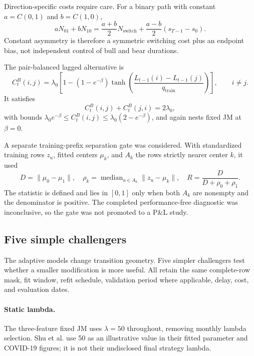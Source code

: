 \documentclass[11pt]{article}
\begin{document}
Direction-specific costs require care. For a binary path with constant
\(a=C(0,1)\) and \(b=C(1,0)\),
\begin{equation}
aN_{01}+bN_{10}
=\frac{a+b}{2}N_{\mathrm{switch}}
+\frac{a-b}{2}(s_{T-1}-s_0).
\label{eq:directed}
\end{equation}
Constant asymmetry is therefore a symmetric switching cost plus an endpoint
bias, not independent control of bull and bear durations.

The pair-balanced lagged alternative is
\begin{equation}
C^B_t(i,j)=\lambda_0\left[
1-(1-e^{-\beta})
\tanh\!\left(
\frac{L_{t-1}(i)-L_{t-1}(j)}{q_{\mathrm{train}}}
\right)\right],\qquad i\ne j.
\label{eq:balanced}
\end{equation}
It satisfies
\begin{equation}
C^B_t(i,j)+C^B_t(j,i)=2\lambda_0,
\label{eq:pairsum}
\end{equation}
with bounds
\(\lambda_0e^{-\beta}\le C^B_t(i,j)\le
\lambda_0(2-e^{-\beta})\), and again nests fixed JM at \(\beta=0\).

A separate training-prefix separation gate was considered. With standardized
training rows \(z_u\), fitted centers \(\mu_k\), and \(A_k\) the rows strictly
nearer center \(k\), it used
\[
D=\|\mu_0-\mu_1\|,
\quad \rho_k=\operatorname{median}_{u\in A_k}\|z_u-\mu_k\|,
\quad R=\frac{D}{D+\rho_0+\rho_1}.
\]
The statistic is defined and lies in \([0,1]\) only when both \(A_k\) are
nonempty and the denominator is positive. The completed performance-free
diagnostic was inconclusive, so the gate was not promoted to a P\&L study.

\subsection{Five simple challengers}

The adaptive models change transition geometry. Five simpler challengers test
whether a smaller modification is more useful. All retain the same complete-row
mask, fit window, refit schedule, validation period where applicable, delay,
cost, and evaluation dates.

\paragraph{Static lambda.}
The three-feature fixed JM uses \(\lambda=50\) throughout, removing monthly
lambda selection. Shu et al. use 50 as an illustrative value in their fitted
parameter and COVID-19 figures; it is not their undisclosed final strategy
lambda.
\end{document}
